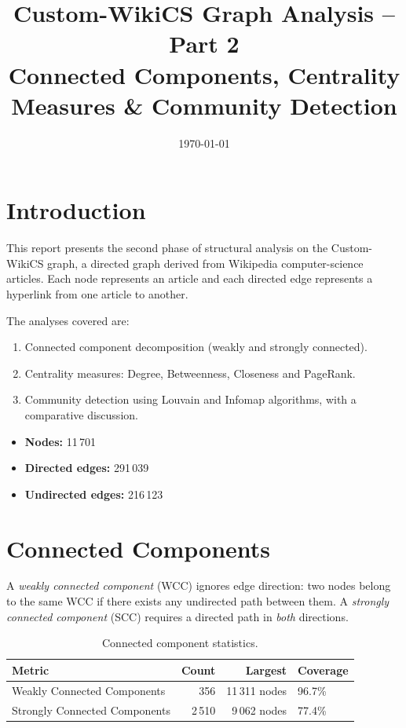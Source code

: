 \documentclass[12pt,a4paper]{article}
\title{Custom-WikiCS Graph Analysis -- Part 2\\[4pt]
\large Connected Components, Centrality Measures \& Community Detection}
\author{}
\date{\today}
\begin{document}
\maketitle

\section{Introduction}

This report presents the second phase of structural analysis on the
Custom-WikiCS graph, a directed graph derived from Wikipedia computer-science
articles.  Each node represents an article and each directed edge represents a
hyperlink from one article to another.

The analyses covered are:
\begin{enumerate}
    \item Connected component decomposition (weakly and strongly connected).
    \item Centrality measures: Degree, Betweenness, Closeness and PageRank.
    \item Community detection using Louvain and Infomap algorithms, with a
          comparative discussion.
\end{enumerate}

\begin{itemize}
    \item \textbf{Nodes:} 11\,701
    \item \textbf{Directed edges:} 291\,039
    \item \textbf{Undirected edges:} 216\,123
\end{itemize}

\section{Connected Components}

A \emph{weakly connected component} (WCC) ignores edge direction: two nodes
belong to the same WCC if there exists any undirected path between them.  A
\emph{strongly connected component} (SCC) requires a directed path in
\emph{both} directions.

\begin{table}[H]
\centering
\caption{Connected component statistics.}
\label{tab:components}
\begin{tabular}{lrrl}
\toprule
\textbf{Metric} & \textbf{Count} & \textbf{Largest} & \textbf{Coverage} \\
\midrule
Weakly Connected Components  & 356   & 11\,311 nodes & 96.7\% \\
Strongly Connected Components & 2\,510 & 9\,062 nodes  & 77.4\% \\
\bottomrule
\end{tabular}
\end{table}
\end{document}
